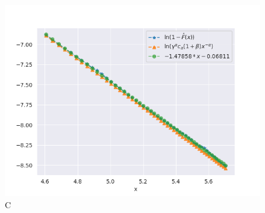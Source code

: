 \documentclass{article}
\begin{document}
		\begin{figure}
			\centering
			\includegraphics[width=1\linewidth]{images/compare_cdf_plots_type_1.png}
			\caption{C}
		\end{figure}
\end{document}
